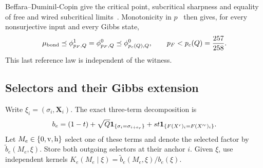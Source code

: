 Beffara--Duminil-Copin give the critical point, subcritical sharpness and equality of free and wired subcritical limits~\cite[Theorems 1 and 2]{BDC}. Monotonicity in $p$~\cite[Theorem 3.21]{Grimmett} then gives, for every nonsurjective input and every Gibbs state,
\begin{equation}\label{eq:full-domination}
 \mu_{\rm bond}\preceq\phi_{p_F,Q}^1
 =\phi_{p_F,Q}^0\preceq\phi_{p_c(Q),Q}^0,
 \qquad p_F<p_c(Q)=\frac{257}{258}.
\end{equation}
This last reference law is independent of the witness.

\subsection{Selectors and their Gibbs extension}\label{sec:full-selectors}
Write $\xi_i=(\sigma_i,\mathbf X_i)$. The exact three-term decomposition is
\begin{equation}\label{eq:selector}
 b_e=(1-t)+\sqrt Q\mathbf 1_{\{\sigma_i=\sigma_{i+e_r}\}}
             +st\mathbf 1_{\{F(X^r)_i=F(X^{\prime r})_i\}}.
\end{equation}
Let $M_e\in\{0,{\rm v},{\rm h}\}$ select one of these terms and denote the selected factor by $\widetilde b_e(M_e,\xi)$. Store both outgoing selectors at their anchor $i$. Given $\xi$, use independent kernels
$K_e(M_e\mid\xi)=\widetilde b_e(M_e,\xi)/b_e(\xi)$.

